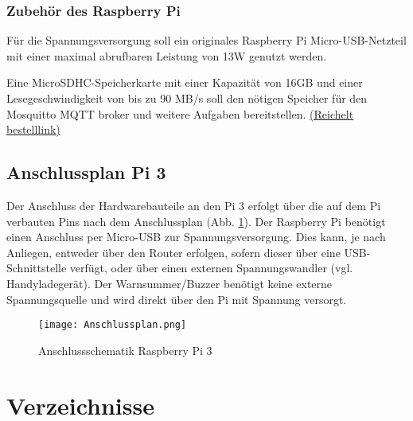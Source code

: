 \documentclass[a4paper,12pt]{article}
\begin{document}
\subsubsection{Zubehör des Raspberry Pi}

Für die Spannungsversorgung soll ein originales Raspberry Pi Micro-USB-Netzteil mit einer maximal abrufbaren Leistung von 13W genutzt werden.\par

Eine MicroSDHC-Speicherkarte mit einer Kapazität von 16GB und einer Lesegeschwindigkeit von bis zu 90 MB/s soll den nötigen Speicher für den Mosquitto MQTT broker und weitere Aufgaben bereitstellen. \href{https://www.reichelt.de/sg/de/microsdhc-speicherkarte-16gb-transcend-class-10-uhs-i-ts16gusdcu1-p220722.html}{(Reichelt bestelllink)} 

\newpage

\subsection{Anschlussplan Pi 3}
Der Anschluss der Hardwarebauteile an den Pi 3 erfolgt über die auf dem Pi verbauten Pins nach dem Anschlussplan (Abb. \ref{Anschlussplan}). Der Raspberry Pi benötigt einen Anschluss per Micro-USB zur Spannungsversorgung. Dies kann, je nach Anliegen, entweder über den Router erfolgen, sofern dieser über eine USB-Schnittstelle verfügt, oder über einen externen Spannungswandler (vgl. Handyladegerät). Der Warnsummer/Buzzer benötigt keine externe Spannungsquelle und wird direkt über den Pi mit Spannung versorgt.

\begin{figure}[H]	%
\begin{center}
\texttt{[image: Anschlussplan.png]}
\caption{Anschlussschematik Raspberry Pi 3}
\label{Anschlussplan}
\end{center}
\end{figure}

\newpage

\section{Verzeichnisse}
\listoffigures %
\listoftables
{}
\end{document}

